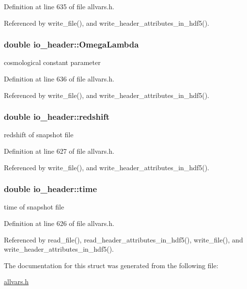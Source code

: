 Definition at line 635 of file allvars.h.



Referenced by write\_\-file(), and write\_\-header\_\-attributes\_\-in\_\-hdf5().

\hypertarget{structio__header_aa2cdc9653addc264b58134006bca1bb8}{
\subsubsection[{OmegaLambda}]{\setlength{\rightskip}{0pt plus 5cm}double {\bf io\_\-header::OmegaLambda}}}
\label{structio__header_aa2cdc9653addc264b58134006bca1bb8}
cosmological constant parameter 

Definition at line 636 of file allvars.h.



Referenced by write\_\-file(), and write\_\-header\_\-attributes\_\-in\_\-hdf5().

\hypertarget{structio__header_ae2484703f374288fb266ff268a1ffa91}{
\subsubsection[{redshift}]{\setlength{\rightskip}{0pt plus 5cm}double {\bf io\_\-header::redshift}}}
\label{structio__header_ae2484703f374288fb266ff268a1ffa91}
redshift of snapshot file 

Definition at line 627 of file allvars.h.



Referenced by write\_\-file(), and write\_\-header\_\-attributes\_\-in\_\-hdf5().

\hypertarget{structio__header_ad6237959a3590772366f18000a47a7d6}{
\subsubsection[{time}]{\setlength{\rightskip}{0pt plus 5cm}double {\bf io\_\-header::time}}}
\label{structio__header_ad6237959a3590772366f18000a47a7d6}
time of snapshot file 

Definition at line 626 of file allvars.h.



Referenced by read\_\-file(), read\_\-header\_\-attributes\_\-in\_\-hdf5(), write\_\-file(), and write\_\-header\_\-attributes\_\-in\_\-hdf5().



The documentation for this struct was generated from the following file:\begin{DoxyCompactItemize}
\item 
\hyperlink{allvars_8h}{allvars.h}\end{DoxyCompactItemize}
